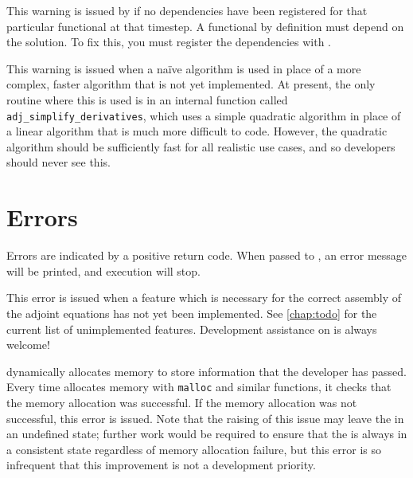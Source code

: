 This warning is issued by  if no dependencies have been
registered for that particular functional at that timestep. A functional by definition must depend on the solution. To fix this, you must register the dependencies with
.

This warning is issued when a na\"ive algorithm is used in place of a more complex,
faster algorithm that is not yet implemented. At present, the only routine where
this is used is in an internal function called \texttt{adj_simplify_derivatives}, which uses a simple quadratic
algorithm in place of a linear algorithm that is much more difficult to code.
However, the quadratic algorithm should be sufficiently fast for all realistic
use cases, and so developers should never see this.

\section{Errors}
Errors are indicated by a positive return code. When passed to ,
an error message will be printed, and execution will stop.

This error is issued when a feature which is necessary for the correct assembly
of the adjoint equations has not yet been implemented. See \autoref{chap:todo}
for the current list of unimplemented features. Development assistance on
\libadjoint is always welcome!

\libadjoint dynamically allocates memory to store information that the developer
has passed. Every time \libadjoint allocates memory with \texttt{malloc} and
similar functions, it checks that the memory allocation was successful. If the memory
allocation was not successful, this error is issued. Note that the raising of this
issue may leave the  in an undefined state; further work would
be required to ensure that the  is always in a consistent state
regardless of memory allocation failure, but this error is so infrequent that 
this improvement is not a \libadjoint development priority.
